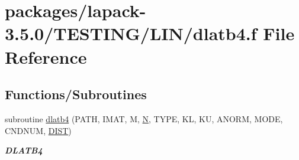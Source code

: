 \hypertarget{dlatb4_8f}{}\section{packages/lapack-\/3.5.0/\+T\+E\+S\+T\+I\+N\+G/\+L\+I\+N/dlatb4.f File Reference}
\label{dlatb4_8f}
\subsection*{Functions/\+Subroutines}
\begin{DoxyCompactItemize}
\item 
subroutine \hyperlink{group__double__lin_gac09912983da8caf02d35f6a5ed360190}{dlatb4} (P\+A\+T\+H, I\+M\+A\+T, M, \hyperlink{polmisc_8c_a0240ac851181b84ac374872dc5434ee4}{N}, T\+Y\+P\+E, K\+L, K\+U, A\+N\+O\+R\+M, M\+O\+D\+E, C\+N\+D\+N\+U\+M, \hyperlink{superlu__enum__consts_8h_af00a42ecad444bbda75cde1b64bd7e72ac04fbbdf0d80a4ad25e565541deeebd7}{D\+I\+S\+T})
\begin{DoxyCompactList}\small\item\em {\bfseries D\+L\+A\+T\+B4} \end{DoxyCompactList}\end{DoxyCompactItemize}
